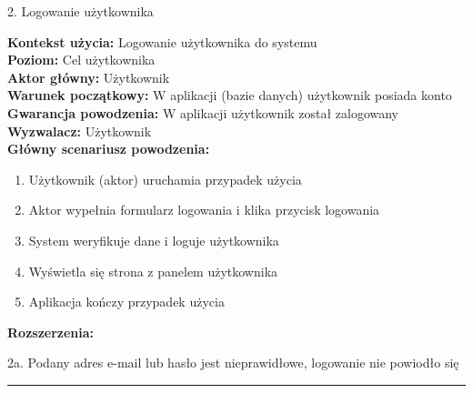 {\noindent \bf{\small 2. Logowanie użytkownika\par}}
\vspace{0.5cm}
{\noindent \bf Kontekst użycia: } Logowanie użytkownika do systemu\\
{\bf Poziom: } Cel użytkownika\\
{\bf Aktor główny: } Użytkownik\\
{\bf Warunek początkowy: } W aplikacji (bazie danych) użytkownik posiada konto\\
{\bf Gwarancja powodzenia: } W aplikacji użytkownik został zalogowany\\
{\bf Wyzwalacz: } Użytkownik\\
{\bf Główny scenariusz powodzenia: }
\begin{center}
    \begin{enumerate}
        \item Użytkownik (aktor) uruchamia przypadek użycia
        \item Aktor wypełnia formularz logowania i klika przycisk logowania
        \item System weryfikuje dane i loguje użytkownika
        \item Wyświetla się strona z panelem użytkownika
        \item Aplikacja kończy przypadek użycia
    \end{enumerate}
\end{center}
{\noindent \bf Rozszerzenia: }
\begin{center}
    \begin{description}
        \item{2a.} Podany adres e-mail lub hasło jest nieprawidłowe, logowanie nie powiodło się
    \end{description}
\end{center}

\noindent\rule{14cm}{0.1pt} %

\clearpage

